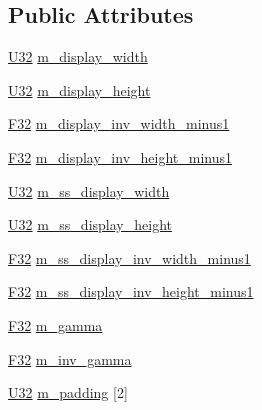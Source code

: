 \subsection*{Public Attributes}
\begin{DoxyCompactItemize}
\item 
\hyperlink{namespacemage_a41c104c036fba3756a74e19f793eeaa1}{U32} \hyperlink{structmage_1_1_game_buffer_abc3b318a7c0d608bd1d72124032d7af8}{m\+\_\+display\+\_\+width}
\item 
\hyperlink{namespacemage_a41c104c036fba3756a74e19f793eeaa1}{U32} \hyperlink{structmage_1_1_game_buffer_ad4543663789eebde08b8775759e40dec}{m\+\_\+display\+\_\+height}
\item 
\hyperlink{namespacemage_aa97e833b45f06d60a0a9c4fc22ae02c0}{F32} \hyperlink{structmage_1_1_game_buffer_a7db70b391fbf5ba58018d4f77ff06bba}{m\+\_\+display\+\_\+inv\+\_\+width\+\_\+minus1}
\item 
\hyperlink{namespacemage_aa97e833b45f06d60a0a9c4fc22ae02c0}{F32} \hyperlink{structmage_1_1_game_buffer_a1958156c6deefba5161e7aab7204a5ea}{m\+\_\+display\+\_\+inv\+\_\+height\+\_\+minus1}
\item 
\hyperlink{namespacemage_a41c104c036fba3756a74e19f793eeaa1}{U32} \hyperlink{structmage_1_1_game_buffer_a5571b4b908c0e25083d3b8949d1c7706}{m\+\_\+ss\+\_\+display\+\_\+width}
\item 
\hyperlink{namespacemage_a41c104c036fba3756a74e19f793eeaa1}{U32} \hyperlink{structmage_1_1_game_buffer_a95b2766f3320627910ec153b512e5695}{m\+\_\+ss\+\_\+display\+\_\+height}
\item 
\hyperlink{namespacemage_aa97e833b45f06d60a0a9c4fc22ae02c0}{F32} \hyperlink{structmage_1_1_game_buffer_ad2d605152c5c5a3e0059e65fd6814238}{m\+\_\+ss\+\_\+display\+\_\+inv\+\_\+width\+\_\+minus1}
\item 
\hyperlink{namespacemage_aa97e833b45f06d60a0a9c4fc22ae02c0}{F32} \hyperlink{structmage_1_1_game_buffer_a28079651a44977c137e07c88de9caabc}{m\+\_\+ss\+\_\+display\+\_\+inv\+\_\+height\+\_\+minus1}
\item 
\hyperlink{namespacemage_aa97e833b45f06d60a0a9c4fc22ae02c0}{F32} \hyperlink{structmage_1_1_game_buffer_a7c7abe0dbee37447b27c9e7f7c95d479}{m\+\_\+gamma}
\item 
\hyperlink{namespacemage_aa97e833b45f06d60a0a9c4fc22ae02c0}{F32} \hyperlink{structmage_1_1_game_buffer_a52ddb29e16782a4dcc4e6818b3983c20}{m\+\_\+inv\+\_\+gamma}
\item 
\hyperlink{namespacemage_a41c104c036fba3756a74e19f793eeaa1}{U32} \hyperlink{structmage_1_1_game_buffer_a6ab9b395e6cf4a6e120bb7ddf4be6913}{m\+\_\+padding} \mbox{[}2\mbox{]}
\end{DoxyCompactItemize}
